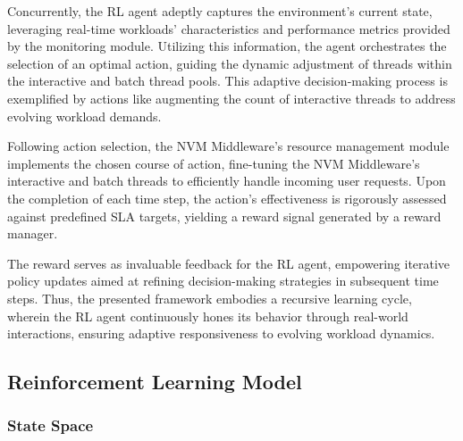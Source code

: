 Concurrently, the RL agent adeptly captures the environment's current state, leveraging real-time workloads' characteristics and performance metrics provided by the monitoring module. Utilizing this information, the agent orchestrates the selection of an optimal action, guiding the dynamic adjustment of threads within the interactive and batch thread pools. This adaptive decision-making process is exemplified by actions like augmenting the count of interactive threads to address evolving workload demands.

Following action selection, the NVM Middleware's resource management module implements the chosen course of action, fine-tuning the NVM Middleware's interactive and batch threads to efficiently handle incoming user requests. Upon the completion of each time step, the action's effectiveness is rigorously assessed against predefined SLA targets, yielding a reward signal generated by a reward manager.

The reward serves as invaluable feedback for the RL agent, empowering iterative policy updates aimed at refining decision-making strategies in subsequent time steps. Thus, the presented framework embodies a recursive learning cycle, wherein the RL agent continuously hones its behavior through real-world interactions, ensuring adaptive responsiveness to evolving workload dynamics.

\subsection{Reinforcement Learning Model}

\subsubsection{State Space}

